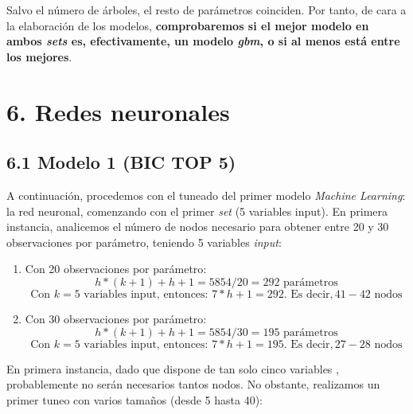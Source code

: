\documentclass[
]{article}
\begin{document}
Salvo el número de árboles, el resto de parámetros coinciden. Por tanto,
de cara a la elaboración de los modelos, \textbf{comprobaremos si el
mejor modelo en ambos \emph{sets} es, efectivamente, un modelo
\emph{gbm}, o si al menos está entre los mejores}.

\hypertarget{redes-neuronales}{%
\section{6. Redes neuronales}\label{redes-neuronales}}

\hypertarget{modelo-1-bic-top-5-1}{%
\subsection{6.1 Modelo 1 (BIC TOP 5)}\label{modelo-1-bic-top-5-1}}

A continuación, procedemos con el tuneado del primer modelo
\emph{Machine Learning}: la red neuronal, comenzando con el primer
\emph{set} (5 variables input). En primera instancia, analicemos el
número de nodos necesario para obtener entre 20 y 30 observaciones por
parámetro, teniendo 5 variables \emph{input}:

\begin{enumerate}
\def\labelenumi{\arabic{enumi}.}
\item
  Con 20 observaciones por parámetro: \[
  h * (k + 1) + h + 1 = 5854 / 20 = 292 \text{ parámetros}
  \] \[
  \text{Con } k = 5 \text{ variables input, entonces: } 7 * h + 1 = 292. \text{ Es decir}, 41-42 \text{ nodos}
  \]
\item
  Con 30 observaciones por parámetro: \[
  h * (k + 1) + h + 1 = 5854 / 30 = 195 \text{ parámetros}
  \] \[
  \text{Con } k = 5 \text{ variables input, entonces: } 7 * h + 1 = 195 \text{. Es decir}, 27-28 \text{ nodos}
  \]
\end{enumerate}

En primera instancia, dado que dispone de tan solo cinco variables ,
probablemente no serán necesarios tantos nodos. No obstante, realizamos
un primer tuneo con varios tamaños (desde 5 hasta 40):
\end{document}
